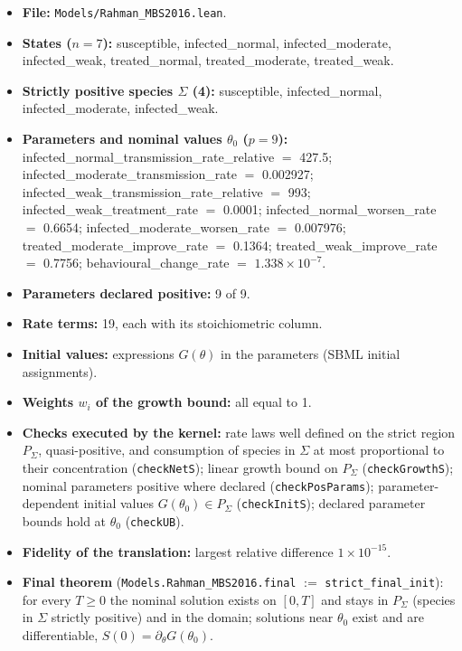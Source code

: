 \begin{itemize}\itemsep0pt\small
\item \textbf{File:} \texttt{Models/Rahman\_MBS2016.lean}.
\item \textbf{States ($n=7$):} susceptible, infected\_normal, infected\_moderate, infected\_weak, treated\_normal, treated\_moderate, treated\_weak.
\item \textbf{Strictly positive species $\Sigma$ (4):} susceptible, infected\_normal, infected\_moderate, infected\_weak.
\item \textbf{Parameters and nominal values $\theta_0$ ($p=9$):} infected\_normal\_transmission\_rate\_relative $=$ 427.5; infected\_moderate\_transmission\_rate $=$ 0.002927; infected\_weak\_transmission\_rate\_relative $=$ 993; infected\_weak\_treatment\_rate $=$ 0.0001; infected\_normal\_worsen\_rate $=$ 0.6654; infected\_moderate\_worsen\_rate $=$ 0.007976; treated\_moderate\_improve\_rate $=$ 0.1364; treated\_weak\_improve\_rate $=$ 0.7756; behavioural\_change\_rate $=$ $1.338\times10^{-7}$.
\item \textbf{Parameters declared positive:} 9 of 9.
\item \textbf{Rate terms:} 19, each with its stoichiometric column.
\item \textbf{Initial values:} expressions $G(\theta)$ in the parameters (SBML initial assignments).
\item \textbf{Weights $w_i$ of the growth bound:} all equal to 1.
\item \textbf{Checks executed by the kernel:} rate laws well defined on the strict region $P_\Sigma$, quasi-positive, and consumption of species in $\Sigma$ at most proportional to their concentration (\texttt{checkNetS}); linear growth bound on $P_\Sigma$ (\texttt{checkGrowthS}); nominal parameters positive where declared (\texttt{checkPosParams}); parameter-dependent initial values $G(\theta_0)\in P_\Sigma$ (\texttt{checkInitS}); declared parameter bounds hold at $\theta_0$ (\texttt{checkUB}).
\item \textbf{Fidelity of the translation:} largest relative difference $1\times10^{-15}$.
\item \textbf{Final theorem} (\texttt{Models.Rahman\_MBS2016.final} $:=$ \texttt{strict\_final\_init}): for every $T\ge0$ the nominal solution exists on $[0,T]$ and stays in $P_\Sigma$ (species in $\Sigma$ strictly positive) and in the domain; solutions near $\theta_0$ exist and are differentiable, $S(0)=\partial_\theta G(\theta_0)$.
\end{itemize}


